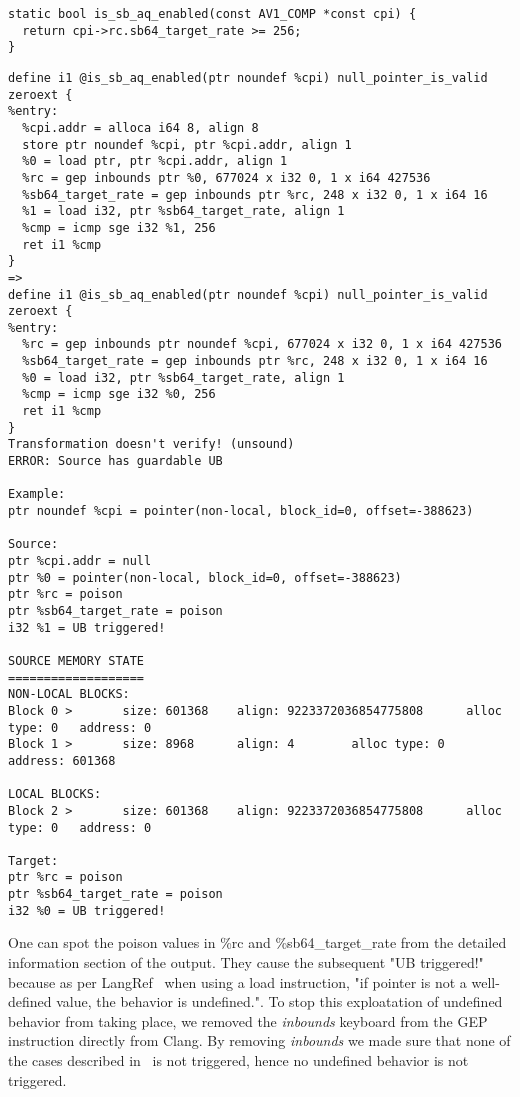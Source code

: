 \begin{lstlisting}[style=Cstyle, caption={C code for is_sb_aq_enabled}, label={lst:is_sb_aq_enabled_c_code}]
static bool is_sb_aq_enabled(const AV1_COMP *const cpi) {
  return cpi->rc.sb64_target_rate >= 256;
}
\end{lstlisting}

\begin{lstlisting}[style=Cstyle, caption={Alive2 output on is_sb_aq_enabled}, label={lst:is_sb_aq_enabled_alive}]
define i1 @is_sb_aq_enabled(ptr noundef %cpi) null_pointer_is_valid zeroext {
%entry:
  %cpi.addr = alloca i64 8, align 8
  store ptr noundef %cpi, ptr %cpi.addr, align 1
  %0 = load ptr, ptr %cpi.addr, align 1
  %rc = gep inbounds ptr %0, 677024 x i32 0, 1 x i64 427536
  %sb64_target_rate = gep inbounds ptr %rc, 248 x i32 0, 1 x i64 16
  %1 = load i32, ptr %sb64_target_rate, align 1
  %cmp = icmp sge i32 %1, 256
  ret i1 %cmp
}
=>
define i1 @is_sb_aq_enabled(ptr noundef %cpi) null_pointer_is_valid zeroext {
%entry:
  %rc = gep inbounds ptr noundef %cpi, 677024 x i32 0, 1 x i64 427536
  %sb64_target_rate = gep inbounds ptr %rc, 248 x i32 0, 1 x i64 16
  %0 = load i32, ptr %sb64_target_rate, align 1
  %cmp = icmp sge i32 %0, 256
  ret i1 %cmp
}
Transformation doesn't verify! (unsound)
ERROR: Source has guardable UB

Example:
ptr noundef %cpi = pointer(non-local, block_id=0, offset=-388623)

Source:
ptr %cpi.addr = null
ptr %0 = pointer(non-local, block_id=0, offset=-388623)
ptr %rc = poison
ptr %sb64_target_rate = poison
i32 %1 = UB triggered!

SOURCE MEMORY STATE
===================
NON-LOCAL BLOCKS:
Block 0 >       size: 601368    align: 9223372036854775808      alloc type: 0   address: 0
Block 1 >       size: 8968      align: 4        alloc type: 0   address: 601368

LOCAL BLOCKS:
Block 2 >       size: 601368    align: 9223372036854775808      alloc type: 0   address: 0

Target:
ptr %rc = poison
ptr %sb64_target_rate = poison
i32 %0 = UB triggered!
\end{lstlisting}

One can spot the poison values in \%rc and \%sb64_target_rate from the detailed
information section of the output. They cause the subsequent "UB triggered!"
because as per
LangRef~\cite{load-semantics} when using a load instruction, "if pointer is not a
well-defined value, the behavior is undefined.". To stop this exploatation of
undefined behavior from taking place, we removed the \textit{inbounds} keyboard
from the GEP instruction directly from Clang. By removing \textit{inbounds} we
made sure that none of the cases described in~\cite{getelementptr-semantics} is
not triggered, hence no undefined behavior is not triggered.

